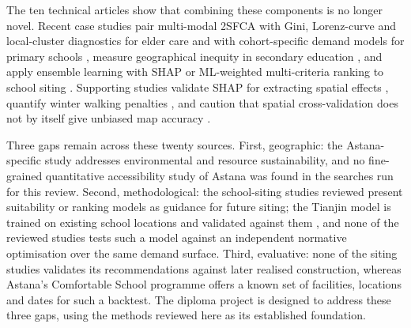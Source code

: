 \documentclass[pdflatex,sn-mathphys-num]{sn-jnl}
\begin{document}
The ten technical articles show that combining these components is no longer novel. Recent case studies pair multi-modal 2SFCA with Gini, Lorenz-curve and local-cluster diagnostics for elder care \cite{eldercare2025} and with cohort-specific demand models for primary schools \cite{chengdu2024}, measure geographical inequity in secondary education \cite{italy2022}, and apply ensemble learning with SHAP or ML-weighted multi-criteria ranking to school siting \cite{tianjin2025,schoolsiting2025}. Supporting studies validate SHAP for extracting spatial effects \cite{li2022,li2024}, quantify winter walking penalties \cite{winterwalk2021}, and caution that spatial cross-validation does not by itself give unbiased map accuracy \cite{wadoux2021}.

Three gaps remain across these twenty sources. First, geographic: the Astana-specific study \cite{astana2025} addresses environmental and resource sustainability, and no fine-grained quantitative accessibility study of Astana was found in the searches run for this review. Second, methodological: the school-siting studies reviewed present suitability or ranking models as guidance for future siting; the Tianjin model is trained on existing school locations and validated against them \cite{tianjin2025}, and none of the reviewed studies tests such a model against an independent normative optimisation over the same demand surface. Third, evaluative: none of the siting studies validates its recommendations against later realised construction, whereas Astana's Comfortable School programme offers a known set of facilities, locations and dates for such a backtest. The diploma project is designed to address these three gaps, using the methods reviewed here as its established foundation.


\end{document}
